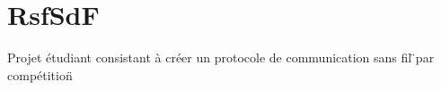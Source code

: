 \chapter{Rsf\+SdF}
\hypertarget{md__r_e_a_d_m_e}{}\label{md__r_e_a_d_m_e}
\label{md__r_e_a_d_m_e_autotoc_md0}%
%
Projet étudiant consistant à créer un protocole de communication sans fil \"{}par compétition\"{} 